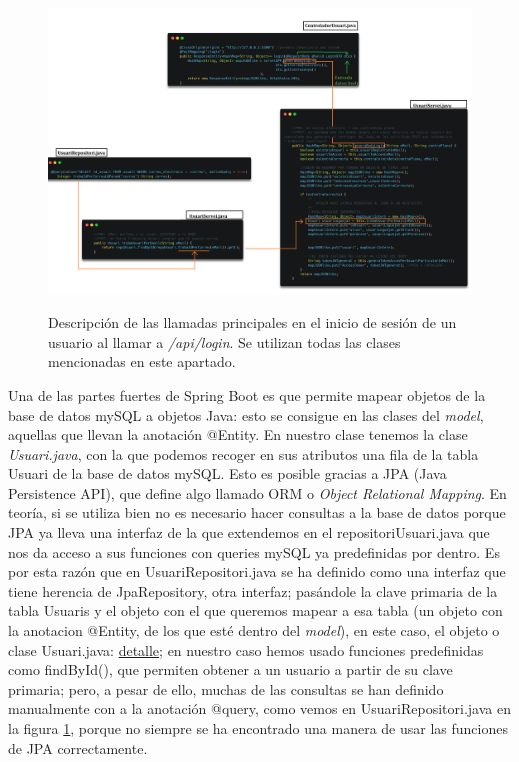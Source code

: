 \documentclass[a4paper,12pt]{report}
\begin{document}
				\FloatBarrier
				\setlength{\belowcaptionskip}{3pt}
				\begin{figure}[H]
					\centering
					\caption{Descripción de las llamadas principales en el inicio de sesión de un usuario al llamar a \textit{/api/login}. Se utilizan todas las clases mencionadas en este apartado.}
					\includegraphics[width=1\linewidth]{img/esquemaArquitecturaSpringboot}
					\label{fig:esquemaArquitecturaSpringboot}
				\end{figure}
				\FloatBarrier
				
				
				Una de las partes fuertes de Spring Boot es que permite mapear objetos de la base de datos mySQL a objetos Java: esto se consigue en las clases del \textit{model}, aquellas que llevan la anotación @Entity. En nuestro clase tenemos la clase \textit{Usuari.java}, con la que podemos recoger en sus atributos una fila de la tabla Usuari de la base de datos mySQL. Esto es posible gracias a JPA (Java Persistence API), que define algo llamado ORM o \textit{Object Relational Mapping}. En teoría, si se utiliza bien no es necesario hacer consultas a la base de datos porque JPA ya lleva una interfaz de la que extendemos en el repositoriUsuari.java que nos da acceso a sus funciones con queries mySQL ya predefinidas por dentro. Es por esta razón que en UsuariRepositori.java se ha definido como una interfaz que tiene herencia de  JpaRepository, otra interfaz; pasándole la clave primaria de la tabla Usuaris y el objeto con el que queremos mapear a esa tabla (un objeto con la anotacion @Entity, de los que esté dentro del \textit{model}), en este caso, el objeto o clase Usuari.java: \href{https://github.com/blackcub3s/mercApp/blob/69c9dffc3a959f9b19b43eaf13236ba99250878e/APP%20WEB/__springboot__produccio__/app/src/main/java/miApp/app/Usuaris/repositori/UsuariRepositori.java#L21}{detalle}; en nuestro caso hemos usado funciones predefinidas como findById(), que permiten obtener a un usuario a partir de su clave primaria; pero, a pesar de ello, muchas de las consultas se han definido manualmente con a la anotación @query, como vemos en UsuariRepositori.java en la figura \ref{fig:esquemaArquitecturaSpringboot}, porque no siempre se ha encontrado una manera de usar las funciones de JPA correctamente.
				
\end{document}
